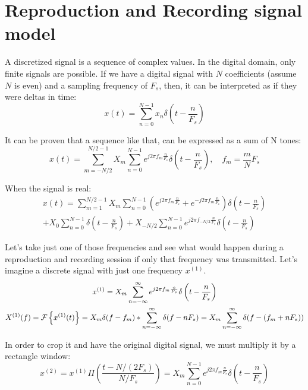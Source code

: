 \chapter{Reproduction and Recording signal model}

A discretized signal is a sequence of complex values. In the digital domain, only finite signals are possible. If we have a digital signal with $N$ coefficients (assume $N$ is even) and a sampling frequency of $F_s$, then, it can be interpreted as if they were deltas in time:
\begin{equation}
x(t) = \sum_{n = 0}^{N-1} x_n \delta(t - \frac{n}{F_s})
\end{equation}

It can be proven that a sequence like that, can be expressed as a sum of N tones:
\begin{equation}
x(t) = \sum_{m= -N/2}^{N/2 - 1} X_m \sum_{n = 0}^{N - 1} e^{j 2 \pi f_m \frac{n}{F_s}} \delta\left(t - \frac{n}{F_s}\right), \quad f_m = \frac{m}{N}F_s
\end{equation}

When the signal is real:
\begin{multline}
x(t) = \sum_{m = 1}^{N/2 - 1} X_m \sum_{n = 0}^{N - 1} \left(e^{j 2 \pi f_m \frac{n}{F_s}} + e^{-j 2 \pi f_m \frac{n}{F_s}}\right)
\delta\left(t - \frac{n}{F_s}\right) \\ + X_0 \sum_{n = 0}^{N - 1}
\delta\left(t - \frac{n}{F_s}\right) + X_{-N/2} \sum_{n = 0}^{N - 1} e^{j 2 \pi f_{-N/2} \frac{n}{F_s}}
\delta\left(t - \frac{n}{F_s}\right)
\end{multline}

Let's take just one of those frequencies and see what would happen during a reproduction and recording session if only that frequency was transmitted. Let's imagine a discrete signal with just one frequency $x^{(1)}$.
\begin{gather}
	x^{(1)} = X_m \sum_{n = -\infty}^{\infty} e^{j 2 \pi f_m \frac{n}{F_s}}
	\delta\left(t - \frac{n}{F_s}\right)
	\\
	X^{(1)}(f) = \FourierTransform{x^{(1)}(t)} = X_m\delta(f - f_m) \ast \sum_{n = -\infty}^{\infty} \delta(f - n F_s) = X_m \sum_{n = -\infty}^{\infty} \delta(f - (f_m + n F_s))
\end{gather}

In order to crop it and have the original digital signal, we must multiply it by a rectangle window:
\begin{equation}
	x^{(2)} = x^{(1)} \Pi\left(\frac{t - N/(2 F_s)}{N/F_s}\right) = X_m \sum_{n = 0}^{N - 1} e^{j 2 \pi f_m \frac{n}{F_s}}
	\delta\left(t - \frac{n}{F_s}\right)
\end{equation}

